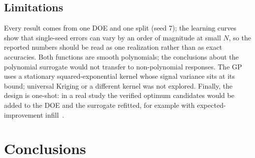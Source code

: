 \subsection{Limitations}

Every result comes from one DOE and one split (seed 7); the learning curves show that single-seed errors can vary by an order of magnitude at small $N$, so the reported numbers should be read as one realization rather than as exact accuracies. Both functions are smooth polynomials; the conclusions about the polynomial surrogate would not transfer to non-polynomial responses. The GP uses a stationary squared-exponential kernel whose signal variance sits at its bound; universal Kriging or a different kernel was not explored. Finally, the design is one-shot: in a real study the verified optimum candidates would be added to the DOE and the surrogate refitted, for example with expected-improvement infill~\cite{jones1998}.

\section{Conclusions}\label{sec:conclusions}

